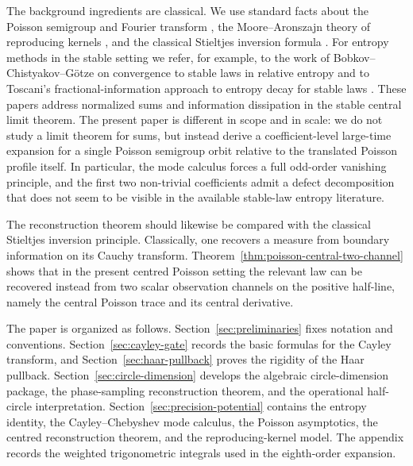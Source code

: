 The background ingredients are classical.  We use standard facts about
the Poisson semigroup and Fourier transform
\cite{Folland1995,Grafakos2014,Stein1971}, the Moore--Aronszajn theory of
reproducing kernels \cite{Aronszajn1950}, and the classical Stieltjes
inversion formula \cite[Chapter~XVII]{Feller1971}.  For entropy methods in
the stable setting we refer, for example, to the work of
Bobkov--Chistyakov--G\"otze on convergence to stable laws in relative
entropy and to Toscani's fractional-information approach to entropy
decay for stable laws \cite{BobkovChistyakovGotze2013,Toscani2015,Toscani2016}.
These papers address normalized sums and information dissipation in the
stable central limit theorem.  The present paper is different in scope and
in scale: we do not study a limit theorem for sums, but instead derive a
coefficient-level large-time expansion for a single Poisson semigroup orbit
relative to the translated Poisson profile itself.  In particular, the
mode calculus forces a full odd-order vanishing principle, and the first
two non-trivial coefficients admit a defect decomposition that does not
seem to be visible in the available stable-law entropy literature.

The reconstruction theorem should likewise be compared with the classical
Stieltjes inversion principle.  Classically, one recovers a measure from
boundary information on its Cauchy transform.  Theorem~\ref{thm:poisson-central-two-channel}
shows that in the present centred Poisson setting the relevant law can be
recovered instead from two scalar observation channels on the positive
half-line, namely the central Poisson trace and its central derivative.

The paper is organized as follows.
Section~\ref{sec:preliminaries} fixes notation and conventions.
Section~\ref{sec:cayley-gate} records the basic formulas for the Cayley
transform, and Section~\ref{sec:haar-pullback} proves the rigidity of the
Haar pullback.  Section~\ref{sec:circle-dimension} develops the algebraic
circle-dimension package, the phase-sampling reconstruction theorem, and
the operational half-circle interpretation.  Section~\ref{sec:precision-potential}
contains the entropy identity, the Cayley--Chebyshev mode calculus, the
Poisson asymptotics, the centred reconstruction theorem, and the
reproducing-kernel model.  The appendix records the weighted trigonometric
integrals used in the eighth-order expansion.
